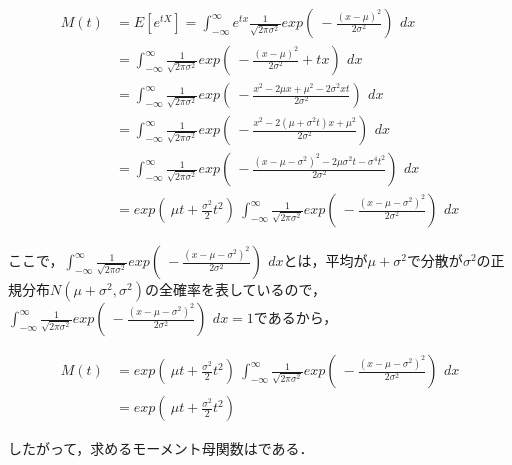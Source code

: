 \documentclass[a4paper,10pt]{jarticle}
\begin{document}
\begin{enumerate}
\begin{equation}
\label{equ21}
\begin{split}
M(t) &= E[e^{tX}] = \int_{-\infty}^{\infty} e^{tx} \frac{1}{\sqrt{2\pi\sigma^2}} exp\left(\ -\frac{(x-\mu)^2}{2\sigma^2}\right)\ \,dx \\
     &= \int_{-\infty}^{\infty} \frac{1}{\sqrt{2\pi\sigma^2}} exp\left(\ -\frac{(x-\mu)^2}{2\sigma^2} + tx \right)\  \,dx \\
		 &= \int_{-\infty}^{\infty} \frac{1}{\sqrt{2\pi\sigma^2}} exp\left(\ -\frac{x^2 -2\mu x + \mu^2 - 2\sigma^2 xt}{2\sigma^2} \right)\  \,dx \\
		 &= \int_{-\infty}^{\infty} \frac{1}{\sqrt{2\pi\sigma^2}} exp\left(\ -\frac{x^2 -2(\mu+\sigma^2t)x + \mu^2}{2\sigma^2} \right)\  \,dx \\
		 &= \int_{-\infty}^{\infty} \frac{1}{\sqrt{2\pi\sigma^2}} exp\left(\ -\frac{(x-\mu-\sigma^2)^2 -2\mu\sigma^2t - \sigma^4t^2}{2\sigma^2}\right)\  \,dx \\
		 &= exp\left(\ \mu t+ \frac{\sigma^2}{2}t^2\right)\ \int_{-\infty}^{\infty} \frac{1}{\sqrt{2\pi\sigma^2}} exp\left(\ -\frac{(x-\mu-\sigma^2)^2}{2\sigma^2}\right)\  \,dx
		\end{split}
\end{equation}

ここで，$\int_{-\infty}^{\infty} \frac{1}{\sqrt{2\pi\sigma^2}} exp\left(\ -\frac{(x-\mu-\sigma^2)^2}{2\sigma^2}\right)\  \,dx$とは，平均が$\mu+\sigma^2$で分散が$\sigma^2$の正規分布$N(\mu+\sigma^2, \sigma^2)$の全確率を表しているので，$\int_{-\infty}^{\infty} \frac{1}{\sqrt{2\pi\sigma^2}} exp\left(\ -\frac{(x-\mu-\sigma^2)^2}{2\sigma^2}\right)\  \,dx = 1$であるから，

\begin{equation}
	\label{equ22}
	\begin{split}
	M(t) &= exp\left(\ \mu t+ \frac{\sigma^2}{2}t^2\right)\ \int_{-\infty}^{\infty} \frac{1}{\sqrt{2\pi\sigma^2}} exp\left(\ -\frac{(x-\mu-\sigma^2)^2}{2\sigma^2}\right)\  \,dx \\
			 &= exp\left(\ \mu t+ \frac{\sigma^2}{2}t^2\right)\
\end{split}
	\end{equation}

したがって，求めるモーメント母関数はである．

\vspace{6mm}


\end{enumerate}
\end{document}

